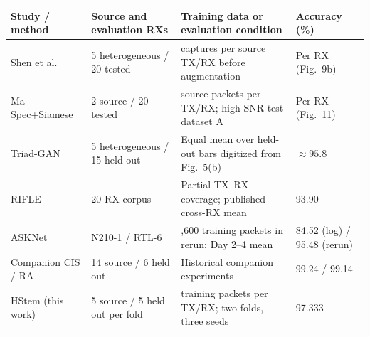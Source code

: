 \begin{tabularx}{\textwidth}{@{}ll>{\raggedright\arraybackslash}Xl@{}}
\toprule
Study / method & Source and evaluation RXs & Training data or evaluation condition & Accuracy (\%)\\
\midrule
Shen et al.\ \cite{shen2024receiver} & 5 heterogeneous / 20 tested & 800 captures per source TX/RX before augmentation & Per RX (Fig.~9b)\\
Ma Spec+Siamese \cite{ma2025robust} & 2 source / 20 tested & 800 source packets per TX/RX; high-SNR test dataset A & Per RX (Fig.~11)\\
Triad-GAN \cite{wang2026triad} & 5 heterogeneous / 15 held out & Equal mean over held-out bars digitized from Fig.~5(b) & $\approx95.8$\\
RIFLE \cite{zhang2026rifle} & 20-RX corpus & Partial TX--RX coverage; published cross-RX mean & 93.90\\
ASKNet \cite{liu2026ask} & N210-1 / RTL-6 & 5,600 training packets in rerun; Day 2--4 mean & 84.52 (log) / 95.48 (rerun)\\
Companion CIS / RA \cite{oobcompanion} & 14 source / 6 held out & Historical companion experiments & 99.24 / 99.14\\
HStem (this work) & 5 source / 5 held out per fold & 160 training packets per TX/RX; two folds, three seeds & 97.333\\
\bottomrule
\end{tabularx}
